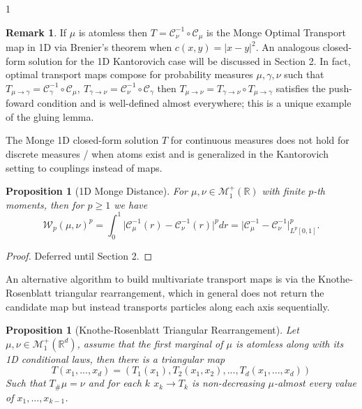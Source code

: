 \documentclass[12pt]{article}
\newtheorem{proposition}[theorem]{Proposition}
\theoremstyle{definition}
\newtheorem*{remark}{Remark}
\theoremstyle{plain}
\begin{document}
\begin{spacing}{1}
\begin{remark}
    If $\mu$ is atomless then $T = \mathcal{C}_\nu^{-1} \circ \mathcal{C}_\mu$ is the Monge Optimal Transport map in 1D via Brenier's theorem when $c(x, y) = \lvert x - y \rvert^2$. An analogous closed-form solution for the 1D Kantorovich case will be discussed in Section 2. In fact, optimal transport maps compose for probability measures $\mu, \gamma, \nu$ such that $T_{\mu \rightarrow \gamma} = \mathcal{C}_\gamma^{-1} \circ \mathcal{C}_\mu, \ T_{\gamma \rightarrow \nu} = \mathcal{C}_\nu^{-1} \circ \mathcal{C}_\gamma$ then $T_{\mu \rightarrow \nu} = T_{\gamma \rightarrow \nu} \circ T_{\mu \rightarrow \gamma}$ satisfies the push-foward condition and is well-defined almost everywhere; this is a unique example of the gluing lemma.
\end{remark}

The Monge 1D closed-form solution $T$ for continuous measures does not hold for discrete measures / when atoms exist and is generalized in the Kantorovich setting to couplings instead of maps.

\newpage

\begin{proposition}[1D Monge Distance]
    For $\mu, \nu \in \mathcal{M}_1^+(\mathbb{R})$ with finite $p$-th moments, then for $p \geq 1$ we have
    \[
    \mathcal{W}_p(\mu, \nu)^p = \displaystyle \int_0^1 \lvert \mathcal{C}_\mu^{-1}(r) - \mathcal{C}_\nu^{-1}(r) \rvert^p dr = \lvert \mathcal{C}_\mu^{-1} - \mathcal{C}_\nu^{-1} \rvert_{L^p[0, 1]}^p.
    \]
\end{proposition}

\begin{proof}
    Deferred until Section 2.
\end{proof}

An alternative algorithm to build multivariate transport maps is via the Knothe-Rosenblatt triangular rearrangement, which in general does not return the candidate map but instead transports particles along each axis sequentially. 

\begin{proposition}[Knothe-Rosenblatt Triangular Rearrangement]
    Let $\mu, \nu \in \mathcal{M}_1^+(\mathbb{R}^d)$, assume that the first marginal of $\mu$ is atomless along with its 1D conditional laws, then there is a triangular map
    \[
    T(x_1, ..., x_d) = (T_1(x_1), T_2(x_1, x_2), ..., T_d(x_1, ..., x_d))
    \]
    Such that $T_\#\mu = \nu$ and for each $k$ $x_k \rightarrow T_k$ is non-decreasing $\mu$-almost every value of $x_1, ..., x_{k-1}$.
\end{proposition}


\end{spacing}
\end{document}
